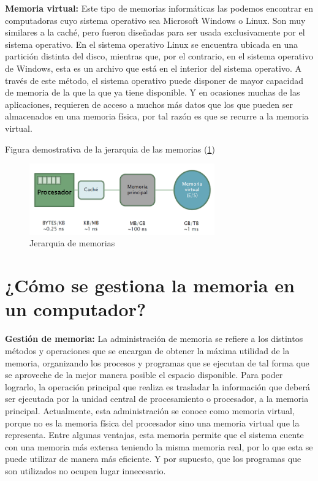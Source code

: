 \documentclass{article}
\begin{document}
\textbf{Memoria virtual:}
Este tipo de memorias informáticas las podemos encontrar en computadoras cuyo sistema operativo sea Microsoft Windows o Linux. Son muy similares a la caché, pero fueron diseñadas para ser usada exclusivamente por el sistema operativo. En el sistema operativo Linux se encuentra ubicada en una partición distinta del disco, mientras que, por el contrario, en el sistema operativo de Windows, esta es un archivo que está en el interior del sistema operativo.\newline
A través de este método, el sistema operativo puede disponer de mayor capacidad de memoria de la que la que ya tiene disponible. Y en ocasiones muchas de las aplicaciones, requieren de acceso a muchos más datos que los que pueden ser almacenados en una memoria física, por tal razón es que se recurre a la memoria virtual.\cite{Google}\newpage

Figura demostrativa de la jerarquia de las memorias (\ref{fig_mem})\newline

\begin{figure}[h]
\includegraphics[width=8cm]{virtual.png}
\centering
\caption{Jerarquia de memorias}
\label{fig_mem}
\end{figure}

\section{¿Cómo se gestiona la memoria en un computador?}
\textbf{Gestión de memoria:}
La administración de memoria se refiere a los distintos métodos y operaciones que se encargan de obtener la máxima utilidad de la memoria, organizando los procesos y programas que se ejecutan de tal forma que se aproveche de la mejor manera posible el espacio disponible.\newline
Para poder lograrlo, la operación principal que realiza es trasladar la información que deberá ser ejecutada por la unidad central de procesamiento o procesador, a la memoria principal. Actualmente, esta administración se conoce como memoria virtual, porque no es la memoria física del procesador sino una memoria virtual que la representa. Entre algunas ventajas, esta memoria permite que el sistema cuente con una memoria más extensa teniendo la misma memoria real, por lo que esta se puede utilizar de manera más eficiente. Y por supuesto, que los programas que son utilizados no ocupen lugar innecesario.\newline
\end{document}
